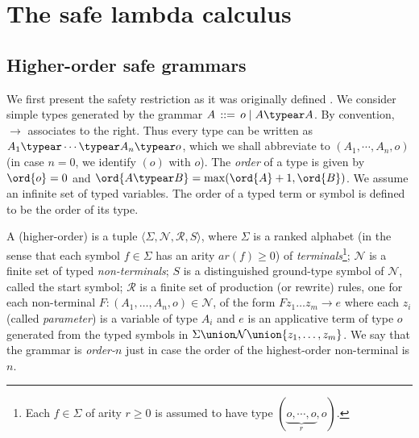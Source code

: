 





\section{The safe lambda calculus}
\label{sec:safe}
\subsection*{Higher-order safe grammars}
We first present the safety restriction as it was originally defined
\cite{KNU02}. We consider simple types generated by the grammar $A \,
::= \, o \; | \; A \typear A$. By convention, $\rightarrow$ associates
to the right. Thus every type can be written as $A_1 \typear \cdots
\typear A_n \typear o$, which we shall abbreviate to $(A_1, \cdots,
A_n, o)$ (in case $n = 0$, we identify $(o)$ with $o$). The
\emph{order} of a type is given by $\ord{o} = 0$ and $\ord{A \typear
  B} = \max(\ord{A}+1, \ord{B})$. We assume an infinite set of typed
variables. The order of a typed term or symbol is defined to be the
order of its type.

A (higher-order)  is a tuple $\langle
\Sigma, \mathcal{N}, \mathcal{R}, S \rangle$, where $\Sigma$ is a
ranked alphabet (in the sense that each symbol $f \in \Sigma$ has an
arity $\mathit{ar}(f) \geq 0$) of \emph{terminals}\footnote{Each $f \in
  \Sigma$ of arity $r \geq 0$ is assumed to have type $(\underbrace{o,
    \cdots, o}_r, o)$.}; $\mathcal{N}$ is a finite set of typed
\emph{non-terminals}; $S$ is a distinguished ground-type symbol of
$\mathcal{N}$, called the start symbol; $\mathcal{R}$ is a finite set
of production (or rewrite) rules, one for each non-terminal $F : (A_1,
\ldots, A_n, o) \in \mathcal{N}$, of the form $ F z_1 \ldots z_m
\rightarrow e$ where each $z_i$ (called \emph{parameter}) is a
variable of type $A_i$ and $e$ is an applicative term of type $o$
generated from the typed symbols in $\Sigma \union \mathcal{N} \union \{z_1,
\ldots, z_m \}$. We say that the grammar is \emph{order-$n$} just in
case the order of the highest-order non-terminal is $n$.

